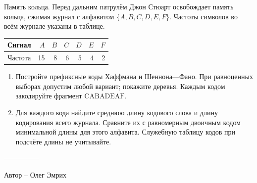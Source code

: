 \question
Память кольца. Перед дальним патрулём Джон Стюарт освобождает память кольца, сжимая журнал с алфавитом $\{A,B,C,D,E,F\}$. Частоты символов во всём журнале указаны в таблице.
\begin{center}\begin{tabular}{c|rrrrrr}Сигнал&$A$&$B$&$C$&$D$&$E$&$F$\\\hline Частота&15&8&6&5&4&2\end{tabular}\end{center}
\begin{enumerate}
\item Постройте префиксные коды Хаффмана и Шеннона---Фано. При равноценных выборах допустим любой вариант; покажите деревья. Каждым кодом закодируйте фрагмент $\mathrm{CABADEAF}$.
\item Для каждого кода найдите среднюю длину кодового слова и длину кодирования всего журнала. Сравните их с равномерным двоичным кодом минимальной длины для этого алфавита. Служебную таблицу кодов при подсчёте длины не учитывайте.
\end{enumerate}

---------------

Автор -- Олег Эмрих
